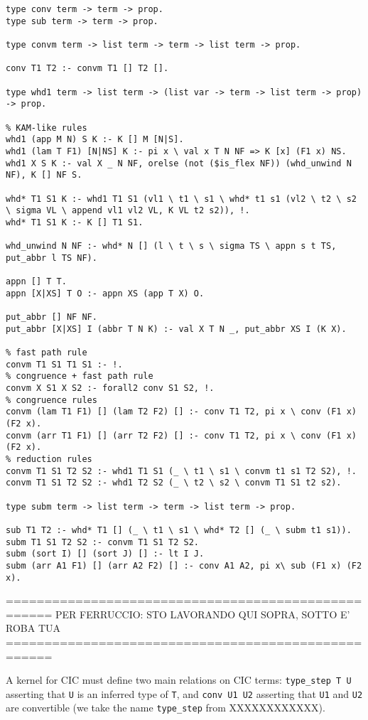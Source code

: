 \begin{verbatim}
type conv term -> term -> prop.
type sub term -> term -> prop.

type convm term -> list term -> term -> list term -> prop.

conv T1 T2 :- convm T1 [] T2 [].

type whd1 term -> list term -> (list var -> term -> list term -> prop) -> prop.

% KAM-like rules
whd1 (app M N) S K :- K [] M [N|S].
whd1 (lam T F1) [N|NS] K :- pi x \ val x T N NF => K [x] (F1 x) NS.
whd1 X S K :- val X _ N NF, orelse (not ($is_flex NF)) (whd_unwind N NF), K [] NF S.

whd* T1 S1 K :- whd1 T1 S1 (vl1 \ t1 \ s1 \ whd* t1 s1 (vl2 \ t2 \ s2 \ sigma VL \ append vl1 vl2 VL, K VL t2 s2)), !.
whd* T1 S1 K :- K [] T1 S1.

whd_unwind N NF :- whd* N [] (l \ t \ s \ sigma TS \ appn s t TS, put_abbr l TS NF).

appn [] T T.
appn [X|XS] T O :- appn XS (app T X) O.

put_abbr [] NF NF.
put_abbr [X|XS] I (abbr T N K) :- val X T N _, put_abbr XS I (K X).

% fast path rule
convm T1 S1 T1 S1 :- !.
% congruence + fast path rule
convm X S1 X S2 :- forall2 conv S1 S2, !.
% congruence rules
convm (lam T1 F1) [] (lam T2 F2) [] :- conv T1 T2, pi x \ conv (F1 x) (F2 x).
convm (arr T1 F1) [] (arr T2 F2) [] :- conv T1 T2, pi x \ conv (F1 x) (F2 x).
% reduction rules
convm T1 S1 T2 S2 :- whd1 T1 S1 (_ \ t1 \ s1 \ convm t1 s1 T2 S2), !.
convm T1 S1 T2 S2 :- whd1 T2 S2 (_ \ t2 \ s2 \ convm T1 S1 t2 s2).

type subm term -> list term -> term -> list term -> prop.

sub T1 T2 :- whd* T1 [] (_ \ t1 \ s1 \ whd* T2 [] (_ \ subm t1 s1)).
subm T1 S1 T2 S2 :- convm T1 S1 T2 S2.
subm (sort I) [] (sort J) [] :- lt I J.
subm (arr A1 F1) [] (arr A2 F2) [] :- conv A1 A2, pi x\ sub (F1 x) (F2 x).
\end{verbatim}


====================================================
PER FERRUCCIO: STO LAVORANDO QUI SOPRA, SOTTO E' ROBA TUA
====================================================

A kernel for CIC must define two main relations on CIC terms:
\verb+type_step T U+
asserting that \verb+U+ is an inferred type of \verb+T+,
and \verb+conv U1 U2+ 
asserting that \verb+U1+ and \verb+U2+ are convertible
(we take the name \verb+type_step+ from XXXXXXXXXXXX).

